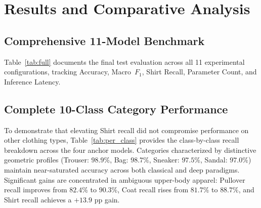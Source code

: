 \documentclass[conference]{IEEEtran}
\begin{document}
\section{Results and Comparative Analysis}\label{sec:results}

\subsection{Comprehensive 11-Model Benchmark}
Table~\ref{tab:full} documents the final test evaluation across all 11 experimental configurations, tracking Accuracy, Macro~$F_1$, Shirt Recall, Parameter Count, and Inference Latency.

\subsection{Complete 10-Class Category Performance}
To demonstrate that elevating Shirt recall did not compromise performance on other clothing types, Table~\ref{tab:per_class} provides the class-by-class recall breakdown across the four anchor models. Categories characterized by distinctive geometric profiles (Trouser: $98.9\%$, Bag: $98.7\%$, Sneaker: $97.5\%$, Sandal: $97.0\%$) maintain near-saturated accuracy across both classical and deep paradigms. Significant gains are concentrated in ambiguous upper-body apparel: Pullover recall improves from $82.4\%$ to $90.3\%$, Coat recall rises from $81.7\%$ to $88.7\%$, and Shirt recall achieves a $+13.9$ pp gain.
\end{document}
